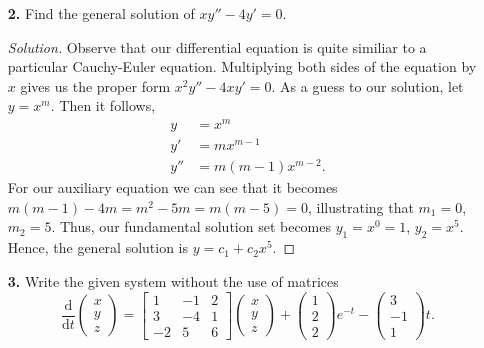 \documentclass[ 12pt ]{article}
\begin{document}
\begin{enumerate}
	\item[\textbf{2.}] Find the general solution of $xy'' - 4y' = 0$.

		\begin{proof}[Solution]\renewcommand{\qedsymbol}{}
			Observe that our differential equation is quite similiar to a particular Cauchy-Euler equation. Multiplying both sides of the equation by $x$ gives us the proper form
			$x^2y'' - 4xy' = 0$. As a guess to our solution, let $y = x^m$. Then it follows,
			\begin{align*}
				y &= x^m \\
				y' &= mx^{m-1} \\
				y'' &= m(m-1)x^{m-2}.
			\end{align*}
			For our auxiliary equation we can see that it becomes $m(m-1) - 4m = m^2 - 5m = m(m - 5) = 0$, illustrating that $m_1 = 0$, $m_2 = 5$. Thus, our fundamental solution
			set becomes $y_1 = x^0 = 1$, $y_2 = x^5$. Hence, the general solution is $y = c_1 + c_2x^5$.
		\end{proof}


	\item[\textbf{3.}] Write the given system without the use of matrices
		$$\frac{\mathrm{d}}{\mathrm{d}t} \begin{pmatrix} x \\ y \\ z \end{pmatrix} = \begin{bmatrix} 1 & -1 & 2 \\ 3 & -4 & 1 \\ -2 & 5 & 6 \end{bmatrix} \begin{pmatrix} x \\ y \\ z \end{pmatrix} + \begin{pmatrix} 1 \\ 2 \\ 2 \end{pmatrix}e^{-t} - \begin{pmatrix} 3 \\ -1 \\ 1 \end{pmatrix}t.$$


\end{enumerate}
\end{document}
